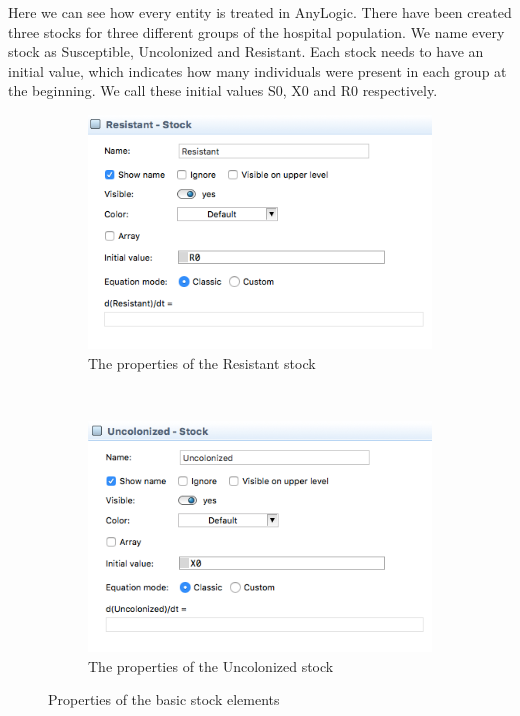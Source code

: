 Here we can see how every entity is treated in AnyLogic. There have been created three stocks for three different groups of the hospital population. We name every stock as Susceptible, Uncolonized and Resistant. Each stock needs to have an initial value, which indicates how many individuals were present in each group at the beginning. We call these initial values S0, X0 and R0 respectively.

\begin{figure}[H]
    \centering
    \begin{subfigure}[b]{0.48\textwidth}
        \includegraphics[width=\textwidth]{img/screens/basic/basic1}
        \caption{The properties of the Resistant stock}
    \end{subfigure}
    ~ %
    \begin{subfigure}[b]{0.48\textwidth}
        \includegraphics[width=\textwidth]{img/screens/basic/basic2}
        \caption{The properties of the Uncolonized stock}
    \end{subfigure}
    \caption{Properties of the basic stock elements}
\end{figure}

